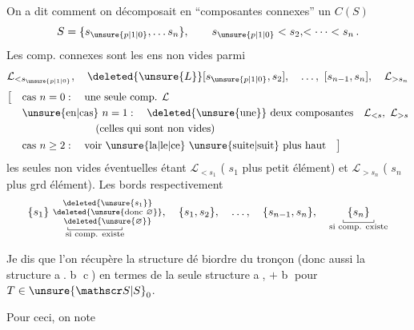 On a dit comment on décomposait en ``composantes connexes'' un $C(S)$ 
\[
 S=\{s_{\unsure{p|1|0}},\ldots s_n\},\qquad s_{\unsure{p|1|0}}<s_2,\!<\cdots<s_n\,.
\]
Les comp. connexes sont les ens non vides parmi
\[
\mathcal L_{<s_{\unsure{p|1|0}}},\quad \deleted{\unsure{L}}[s_{\unsure{p|1|0}},s_2],\quad\ldots,\ [s_{n-1},s_n],\quad \mathcal L_{>s_n}
\]
\[
\begin{aligned}
\bigl[\quad&\text{cas }n=0:\quad\text{une seule comp. }\mathcal L\\
&\text{\unsure{en|cas} }n=1:\quad\deleted{\text{\unsure{une}}}\ \text{deux composantes}\quad \mathcal L_{<s},\ \mathcal L_{>s}\\
&\hspace{7em}\text{(celles qui sont non vides)}\\
&\text{cas }n\geq2:\quad\text{voir \unsure{la|le|ce} \unsure{suite|suit} plus haut}\quad\bigr]
\end{aligned}
\]
les seules non vides éventuelles étant $\mathcal L_{<s_1}$ ( $s_1$ plus petit élément) et $\mathcal L_{>s_n}$ ( $s_n$ plus grd élément). Les bords  respectivement
\[
\underset{\substack{\rule{.4pt}{.6ex}\rule{4.8em}{.4pt}\rule{.4pt}{.6ex}\\\text{si comp. existe}}}{\{s_1\}\ \substack{\deleted{\unsure{s_1}}\\\deleted{\unsure{\text{donc }\varnothing}}\\\deleted{\unsure{\varnothing}}}},
\quad\{s_1,s_2\},\quad\ldots,\quad\{s_{n-1},s_n\},\quad
\underset{\substack{\rule{.4pt}{.6ex}\rule{2.7em}{.4pt}\rule{.4pt}{.6ex}\\\text{si comp. existe}}}{\{s_n\}}
\]

Je dis que l'on récupère la structure dé  biordre du tronçon (donc aussi la structure \textcircled{a}. \textcircled{b} \textcircled{c}) en termes de la seule structure \textcircled{a}, $+$ \textcircled{b} pour $T\in\unsure{\mathscr S|S}_0$.

Pour ceci, on note 

